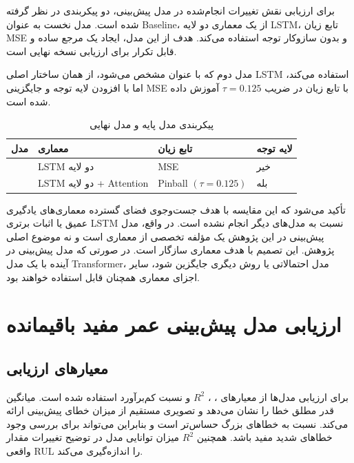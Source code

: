 برای ارزیابی نقش تغییرات انجام‌شده در مدل پیش‌بینی، دو پیکربندی در نظر گرفته شده است. مدل نخست به عنوان \gls{Baseline}، از یک معماری دو لایه LSTM، تابع زیان MSE و بدون سازوکار توجه استفاده می‌کند. هدف از این مدل، ایجاد یک مرجع ساده و قابل تکرار برای ارزیابی نسخه نهایی است.

مدل دوم که با عنوان  مشخص می‌شود، از همان ساختار اصلی LSTM استفاده می‌کند، اما با افزودن لایه توجه و جایگزینی MSE با تابع زیان  در ضریب $\tau=0.125$ آموزش داده شده است.

\begin{table}[ht]
	\centering
	\caption{پیکربندی مدل پایه و مدل نهایی}
	\label{tab:models-evaluation}
	\begin{tabular}{p{4cm}p{4cm}p{3cm}p{3cm}}
		\toprule
		\textbf{مدل} & \textbf{معماری} & \textbf{تابع زیان} & \textbf{لایه توجه} \\
		\midrule
		\lr{Baseline} & LSTM دو لایه & MSE & خیر \\
		\lr{V2} & LSTM دو لایه + Attention & Pinball $(\tau=0.125)$ & بله \\
		\bottomrule
	\end{tabular}
\end{table}

تأکید می‌شود که این مقایسه با هدف جست‌وجوی فضای گسترده معماری‌های یادگیری عمیق یا اثبات برتری LSTM نسبت به مدل‌های دیگر انجام نشده است. در واقع، مدل پیش‌بینی در این پژوهش یک مؤلفه تخصصی از معماری است و نه موضوع اصلی پژوهش. این تصمیم با هدف معماری سازگار است. در صورتی که مدل پیش‌بینی در آینده با یک مدل \gls{Transformer}، مدل احتمالاتی یا روش دیگری جایگزین شود، سایر اجزای معماری همچنان قابل استفاده خواهند بود.

\section{ارزیابی مدل پیش‌بینی عمر مفید باقیمانده}
\label{sec:rul-results}

\subsection{معیارهای ارزیابی}

برای ارزیابی مدل‌ها از معیارهای ، ، $R^2$ و نسبت کم‌برآورد استفاده شده است.  میانگین قدر مطلق خطا را نشان می‌دهد و تصویری مستقیم از میزان خطای پیش‌بینی ارائه می‌کند.  نسبت به خطاهای بزرگ حساس‌تر است و بنابراین می‌تواند برای بررسی وجود خطاهای شدید مفید باشد. همچنین $R^2$ میزان توانایی مدل در توضیح تغییرات مقدار واقعی RUL را اندازه‌گیری می‌کند.

